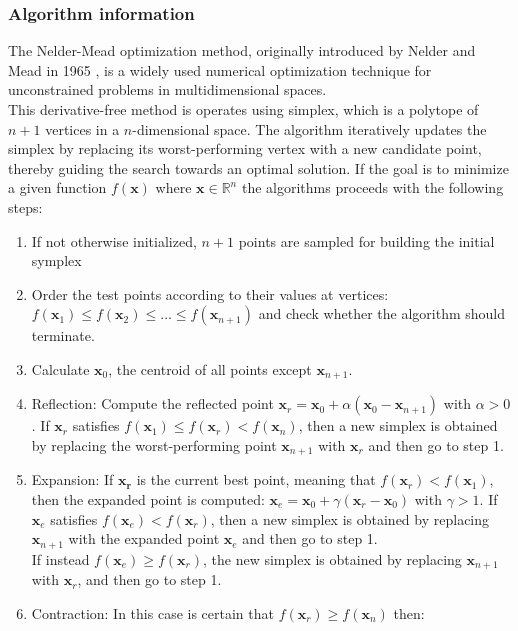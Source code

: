 \subsubsection{Algorithm information}
The Nelder-Mead optimization method, originally introduced by Nelder and Mead in 1965 \cite{NelderMeads}, is a widely used numerical optimization technique for unconstrained problems in multidimensional spaces. \\
This derivative-free method is operates using simplex, which is a polytope of $n+1$ vertices in a $n$-dimensional space.
The algorithm iteratively updates the simplex by replacing its worst-performing vertex with a new candidate point, thereby guiding the search towards an optimal solution. 
If the goal is to minimize a given function $f(\mathbf{x})$ where $\mathbf{x} \in \mathbb{R}^n$ the algorithms proceeds with the following steps:\begin{enumerate}
    \item If not otherwise initialized, $n+1$ points are sampled for building the initial symplex
    \item Order the test points according to their values at vertices: $f(\mathbf{x}_1) \leq f(\mathbf{x}_2) \leq \dots \leq f(\mathbf{x}_{n+1})$ and check whether the algorithm should terminate.
    \item Calculate $\mathbf{x}_0$, the centroid of all points except $\mathbf{x}_{n+1}$.
    \item Reflection: Compute the reflected point $\mathbf{x}_r = \mathbf{x}_0 + \alpha(\mathbf{x}_0 - \mathbf{x}_{n+1})$ with $\alpha > 0$. 
            If $\mathbf{x}_r$ satisfies $f(\mathbf{x}_1) \leq f(\mathbf{x}_r) < f(\mathbf{x}_n)$, then a new simplex is obtained by replacing the worst-performing point $\mathbf{x}_{n+1}$ with $\mathbf{x}_r$ and then go to step 1.
    \item Expansion: If $\mathbf{x_r}$ is the current best point, meaning that $f(\mathbf{x}_r) < f(\mathbf{x}_1)$, then the expanded point is computed: $\mathbf{x}_e = \mathbf{x}_0 + \gamma(\mathbf{x}_r-\mathbf{x}_0)$ with $\gamma>1$.
           If $\mathbf{x}_e$ satisfies $f(\mathbf{x}_e) < f(\mathbf{x}_r)$, then a new simplex is obtained by replacing $\mathbf{x}_{n+1}$ with the expanded point $\mathbf{x}_e$ and then go to step 1.\\
            If instead $f(\mathbf{x}_e) \geq f(\mathbf{x}_r)$, the new simplex is obtained by replacing $\mathbf{x}_{n+1}$ with $\mathbf{x}_r$, and then go to step 1.
    \item Contraction: In this case is certain that $f(\mathbf{x}_r) \geq f(\mathbf{x}_n)$ then:\begin{itemize}

\end{itemize}
\end{enumerate}
